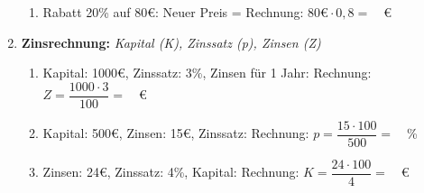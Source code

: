 \begin{enumerate}[label=\arabic*.]
\begin{enumerate}[label=\alph*)]
        \item Rabatt 20\% auf 80€: Neuer Preis = \underline{\hspace{3cm}}
        Rechnung: $80€ \cdot 0,8 = \phantom{00}$€
    \end{enumerate}

    \vspace{1cm}

    \item \textbf{Zinsrechnung:}
    \textit{Kapital (K), Zinssatz (p), Zinsen (Z)}
    \vspace{0.5cm}

    \begin{enumerate}[label=\alph*)]
        \item Kapital: 1000€, Zinssatz: 3\%, Zinsen für 1 Jahr: \underline{\hspace{3cm}}
        Rechnung: $Z = \dfrac{1000 \cdot 3}{100} = \phantom{00}$€
        \vspace{0.5cm}

        \item Kapital: 500€, Zinsen: 15€, Zinssatz: \underline{\hspace{3cm}}
        Rechnung: $p = \dfrac{15 \cdot 100}{500} = \phantom{00}$\%
        \vspace{0.5cm}

        \item Zinsen: 24€, Zinssatz: 4\%, Kapital: \underline{\hspace{3cm}}
        Rechnung: $K = \dfrac{24 \cdot 100}{4} = \phantom{00}$€
    \end{enumerate}

\end{enumerate}